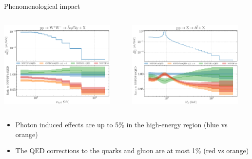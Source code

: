 \documentclass[8pt,t]{beamer}
\begin{document}
\begin{frame}{Phenomenological impact}
  \begin{columns}[T]
    \begin{column}{0.49\textwidth}
      \includegraphics[width=0.9\textwidth]{figures/NNPDF_WPWM_14TEV_40_PHENO-internal.pdf}
    \end{column}
    \begin{column}{0.49\textwidth}
      \includegraphics[width=0.9\textwidth]{figures/NNPDF_DY_14TEV_40_PHENO-internal.pdf}
    \end{column}
  \end{columns}

  \vspace*{1em}
  \begin{itemize}
    \item Photon induced effects are up to 5\% in the high-energy region (blue vs orange)
    \item The QED corrections to the quarks and gluon are at most 1\% (red vs orange)
  \end{itemize}
\end{frame}
\end{document}
